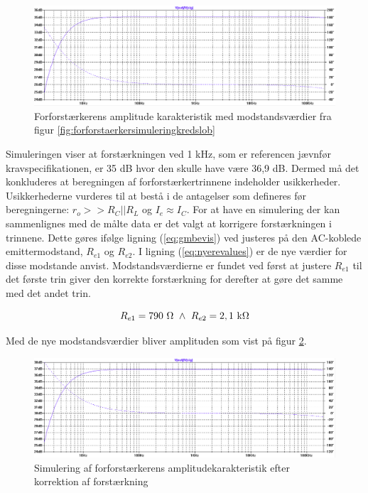 \begin{figure}[h]
\centering
\includegraphics[width=\textwidth]{teknisk/forforstaerker/amplitudeforforstaerker.png}
\caption{Forforstærkerens amplitude karakteristik med modstandsværdier fra figur \ref{fig:forforstaerkersimuleringkredslob}}
\label{fig:amplitude-forforstaerker}
\end{figure}

Simuleringen viser at forstærkningen ved 1 kHz, som er referencen jævnfør kravspecifikationen, er 35 dB hvor den skulle have være 36,9 dB. Dermed må det konkluderes at beregningen af forforstærkertrinnene indeholder usikkerheder. Usikkerhederne vurderes til at bestå i de antagelser som defineres før beregningerne: $r_o >>R_C || R_L$ og $I_e \approx I_C$.
For at have en simulering der kan sammenlignes med de målte data er det valgt at korrigere forstærkningen i trinnene. Dette gøres ifølge ligning (\ref{eq:gmbevis}) ved justeres på den AC-koblede emittermodstand, $R_{e1}$ og $R_{e2}$. I ligning (\ref{eq:nyerevalues}) er de nye værdier for disse modstande anvist. Modstandsværdierne er fundet ved først at justere $R_{e1}$ til det første trin giver den korrekte forstærkning for derefter at gøre det samme med det andet trin.

\begin{equation}
R_{e1}=790~\ohm~\wedge ~R_{e2}=2,1~\mathrm{k}\ohm
\label{eq:nyerevalues}
\end{equation}

Med de nye modstandsværdier bliver amplituden som vist på figur \ref{fig:rigtigamplitudeforforstaerker}.

\begin{figure}[h]
\centering
\includegraphics[width=\textwidth]{teknisk/forforstaerker/rigtigamplitude.png}
\caption{Simulering af forforstærkerens amplitudekarakteristik efter korrektion af forstærkning}
\label{fig:rigtigamplitudeforforstaerker}
\end{figure}

